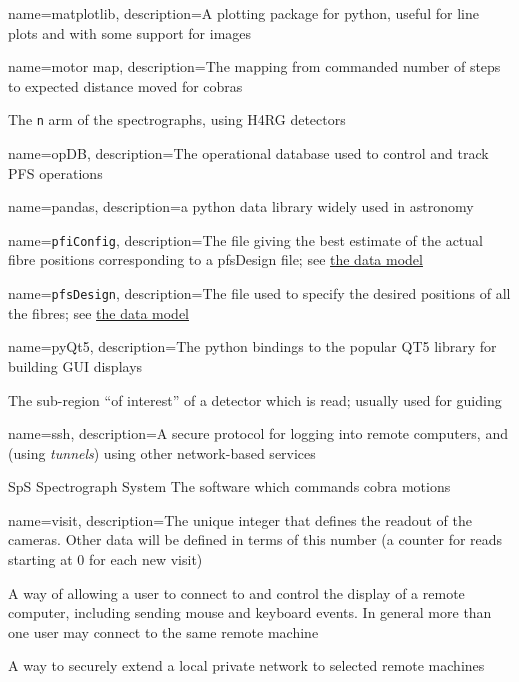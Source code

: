 
{
  name={matplotlib},
  description={A plotting package for python, useful for line plots and with some support for images}
}

{
  name={motor map},
  description={The mapping from commanded number of steps to expected distance moved for cobras}
}

{The \texttt{n} arm of the \PFS spectrographs, using \gls{H4RG} detectors}

{
  name={opDB},
  description={The operational database used to control and track \gls{PFS} operations}
}

{
  name={pandas},
  description={a python data library widely used in astronomy}
}

{
  name={\texttt{pfiConfig}},
  description={The file giving the best estimate of the actual fibre positions corresponding to
  a \gls{pfsDesign} file;
  see \href{https://github.com/Subaru-PFS/datamodel/blob/master/datamodel.txt}{the data model}}
}

{
  name={\texttt{pfsDesign}},
  description={The file used to specify the desired positions of all the fibres;
  see \href{https://github.com/Subaru-PFS/datamodel/blob/master/datamodel.txt}{the data model}}
}


{
  name={pyQt5},
  description={The python bindings to the popular QT5 library for building GUI displays}
}

{The sub-region ``of interest'' of a detector which is read;  usually used for guiding}


{
  name={ssh},
  description={A secure protocol for logging into remote computers, and (using \textit{tunnels})
    using other network-based services}
}

{SpS}
{Spectrograph System}
{The software which commands cobra motions}



{
  name={visit},
  description={The unique integer that defines the readout of the \SPS cameras.  Other data
  will be defined in terms of this number (\eg a counter for \AGC reads starting at 0 for
  each new \gls{visit})}
}

{A way of allowing a user to connect to and control the display of a remote computer, including sending
mouse and keyboard events.  In general more than one user may connect to the same remote machine}

{A way to securely extend a local private network to selected remote machines}
